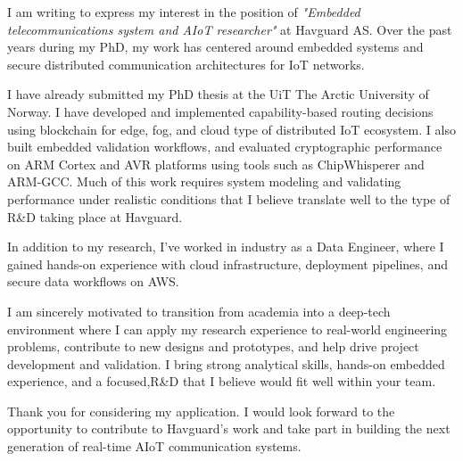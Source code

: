 

I am writing to express my interest in the position of \textit{"Embedded telecommunications system and AIoT researcher"} at Havguard AS. Over the past years during my PhD, my work has centered around embedded systems and secure distributed communication architectures for IoT networks.

I have already submitted my PhD thesis at the UiT The Arctic University of Norway. I have developed and implemented capability-based routing decisions using blockchain for edge, fog, and cloud type of distributed IoT ecosystem.  I also built embedded validation workflows, and evaluated cryptographic performance on ARM Cortex and AVR platforms using tools such as ChipWhisperer and ARM-GCC. Much of this work requires system modeling and validating performance under realistic conditions that I believe translate well to the type of R\&D taking place at Havguard.

In addition to my research, I’ve worked in industry as a Data Engineer, where I gained hands-on experience with cloud infrastructure, deployment pipelines, and secure data workflows on AWS. 

I am sincerely motivated to transition from academia into a deep-tech environment where I can apply my research experience to real-world engineering problems, contribute to new designs and prototypes, and help drive project development and validation. I bring strong analytical skills, hands-on embedded experience, and a focused,R\&D that I believe would fit well within your team.

Thank you for considering my application. I would look forward to the opportunity to contribute to Havguard’s work and take part in building the next generation of real-time AIoT communication systems.